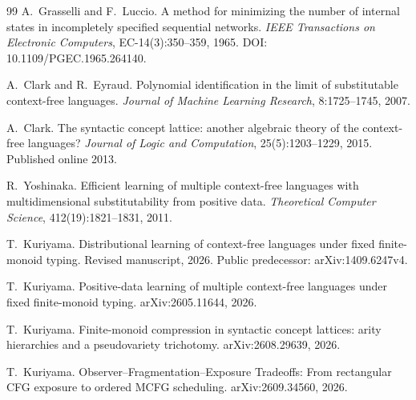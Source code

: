 \documentclass[11pt]{article}
\theoremstyle{definition}
\theoremstyle{remark}
\begin{document}
\begin{thebibliography}{99}
A.~Grasselli and F.~Luccio.
\newblock A method for minimizing the number of internal states in incompletely specified sequential networks.
\newblock \emph{IEEE Transactions on Electronic Computers}, EC-14(3):350--359, 1965.
\newblock DOI: 10.1109/PGEC.1965.264140.

A.~Clark and R.~Eyraud.
\newblock Polynomial identification in the limit of substitutable context-free languages.
\newblock \emph{Journal of Machine Learning Research}, 8:1725--1745, 2007.

A.~Clark.
\newblock The syntactic concept lattice: another algebraic theory of the context-free languages?
\newblock \emph{Journal of Logic and Computation}, 25(5):1203--1229, 2015.
\newblock Published online 2013.

R.~Yoshinaka.
\newblock Efficient learning of multiple context-free languages with multidimensional substitutability from positive data.
\newblock \emph{Theoretical Computer Science}, 412(19):1821--1831, 2011.

T.~Kuriyama.
\newblock Distributional learning of context-free languages under fixed finite-monoid typing.
\newblock Revised manuscript, 2026. Public predecessor: arXiv:1409.6247v4.

T.~Kuriyama.
\newblock Positive-data learning of multiple context-free languages under fixed finite-monoid typing.
\newblock arXiv:2605.11644, 2026.

T.~Kuriyama.
\newblock Finite-monoid compression in syntactic concept lattices: arity hierarchies and a pseudovariety trichotomy.
\newblock arXiv:2608.29639, 2026.

T.~Kuriyama.
\newblock Observer--Fragmentation--Exposure Tradeoffs: From rectangular CFG exposure to ordered MCFG scheduling.
\newblock arXiv:2609.34560, 2026.

\end{thebibliography}
\end{document}
